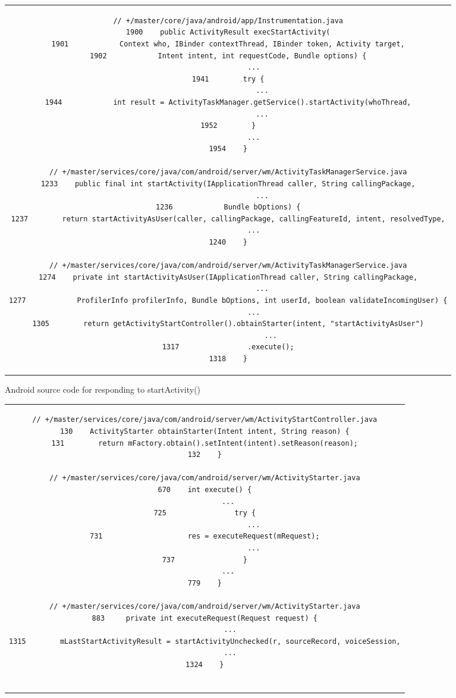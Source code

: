 {\begin{figure}[htbp]
\begin{tabular}{c}
\begin{lstlisting}
// +/master/core/java/android/app/Instrumentation.java
1900    public ActivityResult execStartActivity(
1901            Context who, IBinder contextThread, IBinder token, Activity target,
1902            Intent intent, int requestCode, Bundle options) {
            ...
1941        try {
                ...
1944            int result = ActivityTaskManager.getService().startActivity(whoThread,
                ...
1952        }
            ...
1954    }

// +/master/services/core/java/com/android/server/wm/ActivityTaskManagerService.java
1233    public final int startActivity(IApplicationThread caller, String callingPackage,
                ...
1236            Bundle bOptions) {
1237        return startActivityAsUser(caller, callingPackage, callingFeatureId, intent, resolvedType,
            ...
1240    }

// +/master/services/core/java/com/android/server/wm/ActivityTaskManagerService.java
1274    private int startActivityAsUser(IApplicationThread caller, String callingPackage,
                ...
1277            ProfilerInfo profilerInfo, Bundle bOptions, int userId, boolean validateIncomingUser) {
            ...
1305        return getActivityStartController().obtainStarter(intent, "startActivityAsUser")
                    ...
1317                .execute();
1318    }
\end{lstlisting}
\end{tabular}
\caption{Android source code for responding to startActivity()}\label{code-startActivity-1}
\end{figure}

\begin{figure}[htbp]
\centering
\begin{tabular}{c}
\begin{lstlisting}
// +/master/services/core/java/com/android/server/wm/ActivityStartController.java
130    ActivityStarter obtainStarter(Intent intent, String reason) {
131        return mFactory.obtain().setIntent(intent).setReason(reason);
132    }

// +/master/services/core/java/com/android/server/wm/ActivityStarter.java
670    int execute() {
           ...
725                try {
                       ...
731                    res = executeRequest(mRequest);
                       ...
737                }
           ...
779    }

// +/master/services/core/java/com/android/server/wm/ActivityStarter.java
883     private int executeRequest(Request request) {
            ...
1315        mLastStartActivityResult = startActivityUnchecked(r, sourceRecord, voiceSession,
            ...
1324    }


\end{lstlisting}
\end{tabular}
\end{figure}}

